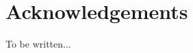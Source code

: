 

\cleardoublepage

\tableofcontents                %

\cleardoublepage


{%
\let\oldnumberline\numberline%
\renewcommand{\numberline}{\figurename~\oldnumberline}%
\listoffigures%
}

\cleardoublepage




\chapter{Acknowledgements}      %
To be written...


